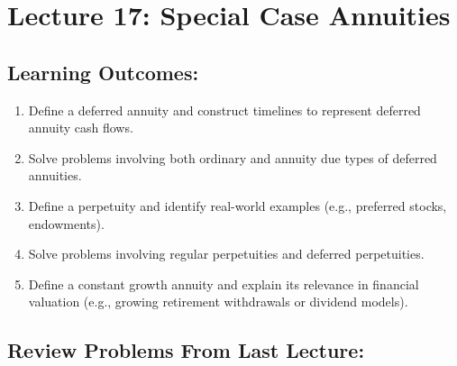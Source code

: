 \documentclass[
]{book}
\providecommand{\tightlist}{%
  \setlength{\itemsep}{0pt}\setlength{\parskip}{0pt}}
\begin{document}
\section*{Lecture 17: Special Case Annuities}\label{lecture-17-special-case-annuities}

\subsection*{Learning Outcomes:}\label{learning-outcomes-16}

\begin{enumerate}
\def\labelenumi{\arabic{enumi}.}
\tightlist
\item
  Define a deferred annuity and construct timelines to represent deferred annuity cash flows.
\item
  Solve problems involving both ordinary and annuity due types of deferred annuities.
\item
  Define a perpetuity and identify real-world examples (e.g., preferred stocks, endowments).
\item
  Solve problems involving regular perpetuities and deferred perpetuities.
\item
  Define a constant growth annuity and explain its relevance in financial valuation (e.g., growing retirement withdrawals or dividend models).
\end{enumerate}

\subsection*{Review Problems From Last Lecture:}\label{review-problems-from-last-lecture-15}
\end{document}
